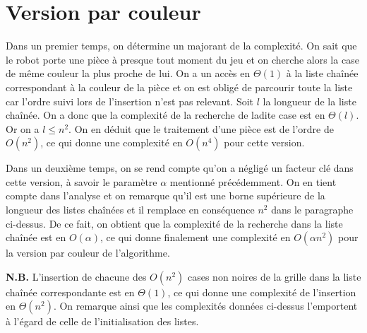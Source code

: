 \documentclass[12pt,a4paper]{article}
\begin{document}
\section{Version par couleur}
Dans un premier temps, on d\'etermine un majorant de la complexit\'e. On sait 
que le robot porte une pi\`ece \`a presque tout moment du jeu et on cherche 
alors la case de m\^eme couleur la plus proche de lui. On a un acc\`es en 
$\Theta(1)$ \`a la liste cha\^in\'ee correspondant \`a la couleur de la pi\`ece 
et on est oblig\'e de parcourir toute la liste car l'ordre suivi lors de 
l'insertion n'est pas relevant. Soit $l$ la longueur de la liste cha\^in\'ee. On 
a donc que la complexit\'e de la recherche de ladite case est en $\Theta(l)$. Or 
on a $l \leq n^2$. On en d\'eduit que le traitement d'une pi\`ece est de l'ordre 
de $O(n^2)$, ce qui donne une complexit\'e en $O(n^4)$ pour cette version. 

Dans un deuxi\`eme temps, on se rend compte qu'on a n\'eglig\'e un facteur cl\'e 
dans cette version, \`a savoir le param\`etre $\alpha$ mentionn\'e 
pr\'ec\'edemment. On en tient compte dans l'analyse et on remarque qu'il est une 
borne sup\'erieure de la longueur des listes cha\^in\'ees et il remplace en 
cons\'equence $n^2$ dans le paragraphe ci-dessus. De ce fait, on obtient que la 
complexit\'e de la recherche dans la liste cha\^in\'ee est en $O(\alpha)$, ce 
qui donne finalement une complexit\'e en $O(\alpha n^2)$ pour la version par 
couleur de l'algorithme.

{\bfseries N.B.} L'insertion de chacune des $O(n^2)$ cases non noires de la 
grille dans la liste cha\^in\'ee correspondante est en $\Theta(1)$, ce qui donne 
une complexit\'e de l'insertion en $\Theta(n^2)$. On remarque ainsi que les 
complexit\'es donn\'ees ci-dessus l'emportent \`a l'\'egard de celle de 
l'initialisation des listes.

\end{document}
